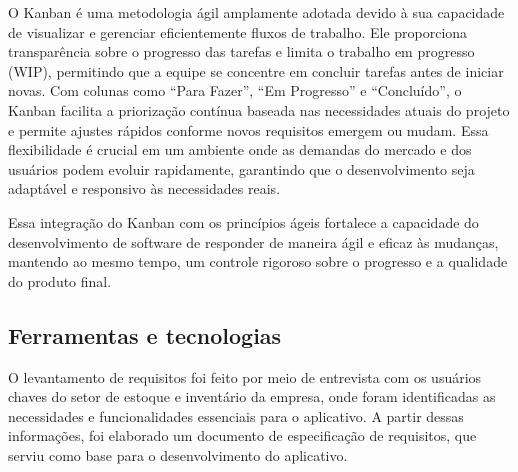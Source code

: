 O Kanban é uma metodologia ágil amplamente adotada devido à sua capacidade de visualizar e gerenciar eficientemente fluxos de trabalho. Ele proporciona transparência sobre o progresso das tarefas e limita o trabalho em progresso (WIP), permitindo que a equipe se concentre em concluir tarefas antes de iniciar novas. Com colunas como “Para Fazer”, “Em Progresso” e “Concluído”, o Kanban facilita a priorização contínua baseada nas necessidades atuais do projeto e permite ajustes rápidos conforme novos requisitos emergem ou mudam. Essa flexibilidade é crucial em um ambiente onde as demandas do mercado e dos usuários podem evoluir rapidamente, garantindo que o desenvolvimento seja adaptável e responsivo às necessidades reais.

Essa integração do Kanban com os princípios ágeis fortalece a capacidade do desenvolvimento de software de responder de maneira ágil e eficaz às mudanças, mantendo ao mesmo tempo, um controle rigoroso sobre o progresso e a qualidade do produto final.

\subsection{Ferramentas e tecnologias}

O levantamento de requisitos foi feito por meio de entrevista com os usuários chaves do setor de estoque e inventário da empresa, onde foram identificadas as necessidades e funcionalidades essenciais para o aplicativo. A partir dessas informações, foi elaborado um documento de especificação de requisitos, que serviu como base para o desenvolvimento do aplicativo.

